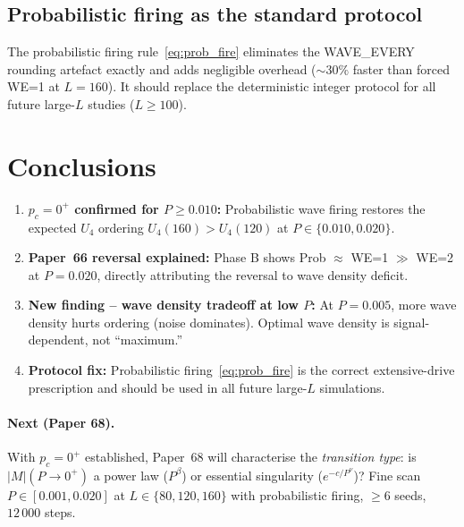 \documentclass[11pt,a4paper]{article}
\begin{document}
\subsection{Probabilistic firing as the standard protocol}

The probabilistic firing rule~\eqref{eq:prob_fire} eliminates the
WAVE\_EVERY rounding artefact exactly and adds negligible overhead
($\sim30\%$ faster than forced WE=1 at $L=160$).
It should replace the deterministic integer protocol for all
future large-$L$ studies ($L\ge100$).

\section{Conclusions}

\begin{enumerate}
\item \textbf{$p_c = 0^+$ confirmed for $P\ge0.010$:}
  Probabilistic wave firing restores the expected $U_4$ ordering
  $U_4(160)>U_4(120)$ at $P\in\{0.010,0.020\}$.
\item \textbf{Paper~66 reversal explained:}
  Phase B shows Prob $\approx$ WE=1 $\gg$ WE=2 at $P=0.020$,
  directly attributing the reversal to wave density deficit.
\item \textbf{New finding -- wave density tradeoff at low $P$:}
  At $P=0.005$, more wave density hurts ordering (noise dominates).
  Optimal wave density is signal-dependent, not ``maximum.''
\item \textbf{Protocol fix:} Probabilistic firing~\eqref{eq:prob_fire}
  is the correct extensive-drive prescription and should be used
  in all future large-$L$ simulations.
\end{enumerate}

\paragraph{Next (Paper 68).}
With $p_c=0^+$ established, Paper~68 will characterise the
\emph{transition type}: is $|M|(P\to0^+)$ a power law ($P^\beta$)
or essential singularity ($e^{-c/P^\nu}$)?
Fine scan $P\in[0.001,0.020]$ at $L\in\{80,120,160\}$ with
probabilistic firing, $\ge6$ seeds, $12\,000$ steps.
\end{document}
